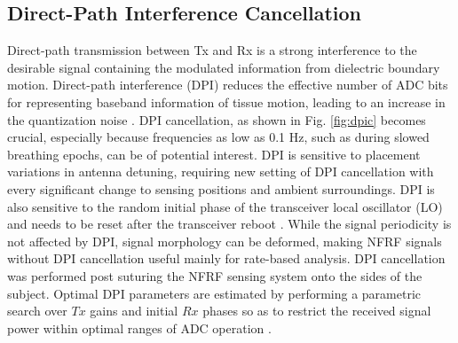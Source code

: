 \documentclass[journal]{IEEEtran}
\begin{document}
\subsection{Direct-Path Interference Cancellation}
Direct-path transmission between Tx and Rx is a strong interference to the desirable signal containing the modulated information from dielectric boundary motion. Direct-path interference (DPI) reduces the effective number of ADC bits for representing baseband information of tissue motion, leading to an increase in the quantization noise \cite{zhouMorphologyTransformationContent2022}\cite{kuo_fully_2016}. DPI cancellation, as shown in Fig. \ref{fig:dpic} becomes crucial, especially because frequencies as low as 0.1 Hz, such as during slowed breathing epochs, can be of potential interest. DPI is sensitive to placement variations in antenna detuning, requiring new setting of DPI cancellation with every significant change to sensing positions and ambient surroundings. DPI is also sensitive to the random initial phase of the transceiver local oscillator (LO) and needs to be reset after the transceiver reboot \cite{xuPhaseOffsetCalibration2024}. While the signal periodicity is not affected by DPI, signal morphology can be deformed, making NFRF signals without DPI cancellation useful mainly for rate-based analysis.
DPI cancellation was performed post suturing the NFRF sensing system onto the sides of the subject. Optimal DPI parameters are estimated by performing a parametric search over $Tx$ gains and initial $Rx$ phases so as to restrict the received signal power within optimal ranges of ADC operation \cite{huiNearFieldCoherentSensing2021}.
\end{document}
